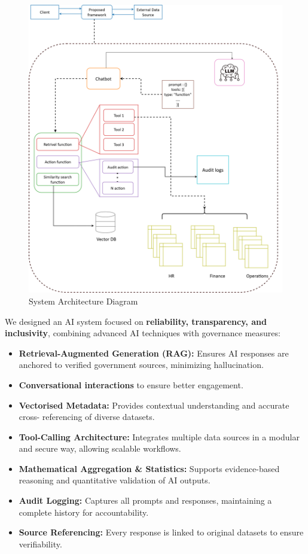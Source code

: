 \begin{figure}[h]
    \centering
    \includegraphics[width=0.85\linewidth]{img/GovHack-Architecture}
    \caption{System Architecture Diagram}
\end{figure}



We designed an AI system focused on \textbf{reliability, transparency, and inclusivity},
combining advanced AI techniques with governance measures:

\begin{itemize}
    \item \textbf{Retrieval-Augmented Generation (RAG):} Ensures AI responses are anchored to
    verified government sources, minimizing hallucination. 
    \item \textbf{Conversational interactions} to ensure better engagement. 
    \item \textbf{Vectorised Metadata:} Provides contextual understanding and accurate cross-
    referencing of diverse datasets. 
    \item \textbf{Tool-Calling Architecture:} Integrates multiple data sources in a modular and
    secure way, allowing scalable workflows.
    \item \textbf{Mathematical Aggregation \& Statistics:} Supports evidence-based reasoning
    and quantitative validation of AI outputs. 
    \item \textbf{Audit Logging:} Captures all prompts and responses, maintaining a complete
    history for accountability. 
    \item \textbf{Source Referencing:} Every response is linked to original datasets to ensure
    verifiability.
\end{itemize}

